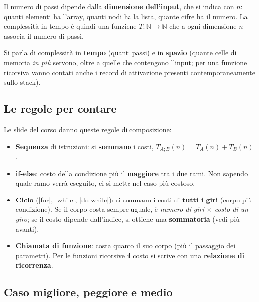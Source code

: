 Il numero di passi dipende dalla \textbf{dimensione dell'input}, che si indica con
$n$: quanti elementi ha l'array, quanti nodi ha la lista, quante cifre ha il
numero. La complessità in tempo è quindi una funzione $T : \mathbb{N} \to \mathbb{N}$
che a ogni dimensione $n$ associa il numero di passi.

Si parla di complessità in \textbf{tempo} (quanti passi) e in \textbf{spazio}
(quante celle di memoria \emph{in più} servono, oltre a quelle che contengono
l'input; per una funzione ricorsiva vanno contati anche i record di attivazione
presenti contemporaneamente sullo stack).

\subsection*{Le regole per contare}

Le slide del corso danno queste regole di composizione:
\begin{itemize}
  \item \textbf{Sequenza} di istruzioni: si \textbf{sommano} i costi,
        $T_{A;B}(n) = T_A(n) + T_B(n)$.
  \item \textbf{if-else}: costo della condizione più il \textbf{maggiore} tra i
        due rami. Non sapendo quale ramo verrà eseguito, ci si mette nel caso più
        costoso.
  \item \textbf{Ciclo} (\cc|for|, \cc|while|, \cc|do-while|): si sommano i costi di
        \textbf{tutti i giri} (corpo più condizione). Se il corpo costa sempre uguale,
        è \emph{numero di giri $\times$ costo di un giro}; se il costo dipende
        dall'indice, si ottiene una \textbf{sommatoria} (vedi più avanti).
  \item \textbf{Chiamata di funzione}: costa quanto il suo corpo (più il passaggio
        dei parametri). Per le funzioni ricorsive il costo si scrive con una
        \textbf{relazione di ricorrenza}.
\end{itemize}

\subsection*{Caso migliore, peggiore e medio}

